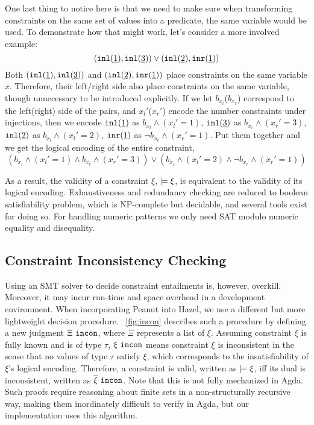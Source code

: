 One last thing to notice here is that we need to make sure when transforming constraints on the same set of values into a predicate, the same variable would be used. To demonstrate how that might work, let's consider a more involved example:
\[ (\mathtt{inl}(\underline{1}) , \mathtt{inl}(\underline{3})) \vee (\mathtt{inl}(\underline{2}) , \mathtt{inr}(\underline{1})) \]
Both $(\mathtt{inl}(\underline{1}) , \mathtt{inl}(\underline{3}))$ and $(\mathtt{inl}(\underline{2}) , \mathtt{inr}(\underline{1}))$ place constraints on the same variable $x$.
Therefore, their left/right side also place constraints on the same variable, though unnecessary to be introduced explicitly.
If we let $b_{x_l}$($b_{x_r}$) correspond to the left(right) side of the pairs, and $x_l'$($x_r'$) encode the number constraints under injections, 
then 
we encode $\mathtt{inl}(\underline{1})$ as $b_{x_l} \wedge (x_l'=1)$, 
$\mathtt{inl}(\underline{3})$ as $b_{x_r} \wedge (x_r'=3)$,
$\mathtt{inl}(\underline{2})$ as $b_{x_l} \wedge (x_l'=2)$,
$\mathtt{inr}(\underline{1})$ as $\neg b_{x_r} \wedge (x_r'=1)$. 
Put them together and we get the logical encoding of the entire constraint, 
\[
(b_{x_l} \wedge (x_l'=1) \wedge
b_{x_r} \wedge (x_r'=3))
\vee
(b_{x_l} \wedge (x_l'=2) \wedge
\neg b_{x_r} \wedge (x_r'=1))
\]

As a result, the validity of a constraint $\xi$, $\models \xi$, is equivalent to the validity of its logical encoding. Exhaustiveness and redundancy checking are reduced to boolean satisfiability problem, which is NP-complete but decidable, and several tools exist for doing so. For handling numeric patterns we only need SAT modulo numeric equality and disequality.

\subsection{Constraint Inconsistency Checking}

Using an SMT solver to decide constraint entailments is, however, overkill. Moreover, it may incur run-time and space overhead in a  development environment. When incorporating Peanut into Hazel, we use a different but more lightweight decision procedure. \figurename~\ref{fig:incon} describes such a procedure by defining a new judgment $\Xi ~\mathtt{incon}$, where $\Xi$ represents a list of $\xi$. Assuming constraint $\xi$ is fully known and is of type $\tau$, $\xi ~\mathtt{incon}$ means constraint $\xi$ is inconsistent in the sense that no values of type $\tau$ satisfy $\xi$, which corresponds to the insatisfiability of $\xi$'s logical encoding. Therefore, a constraint is valid, written as $\models \xi$, iff its dual is inconsistent, written as $\overline{\xi} ~\mathtt{incon}$. Note that this is not fully mechanized in Agda. Such proofs require reasoning about finite sets in a non-structurally recursive way, making them inordinately difficult to verify in Agda, but our implementation uses this algorithm.




%
